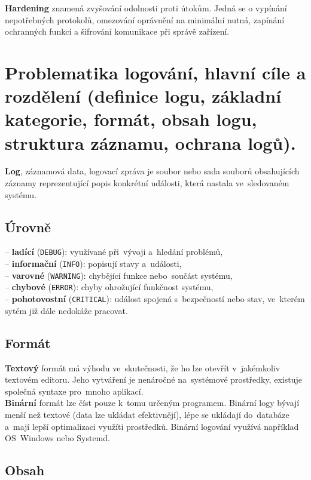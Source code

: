 \textbf{Hardening} znamená zvyšování odolnosti proti útokům. Jedná se o vypínání nepotřebných protokolů, omezování oprávnění na minimální nutná, zapínání ochranných funkcí a šifrování komunikace při správě zařízení.

\clearpage
\section{Problematika logování, hlavní cíle a rozdělení (definice logu, základní kategorie, formát, obsah logu, struktura záznamu, ochrana logů).}

\textbf{Log}, záznamová data, logovací zpráva je soubor nebo sada souborů obsahujících záznamy reprezentující popis konkrétní události, která nastala ve~sledovaném systému.

\subsection{Úrovně}

-- \textbf{ladící} (\texttt{DEBUG}): využívané při~vývoji a~hledání problémů, \\
-- \textbf{informační} (\texttt{INFO}): popisují stavy a~události, \\
-- \textbf{varovné} (\texttt{WARNING}): chybějící funkce nebo~součást systému, \\
-- \textbf{chybové} (\texttt{ERROR}): chyby ohrožující funkčnost systému, \\
-- \textbf{pohotovostní} (\texttt{CRITICAL}): událost spojená s~bezpečností nebo stav, ve~kterém sytém již dále nedokáže pracovat.

\subsection{Formát}

\textbf{Textový} formát má výhodu ve~skutečnosti, že ho lze otevřít v~jakémkoliv textovém editoru. Jeho vytváření je nenáročné na~systémové prostředky, existuje společná syntaxe pro~mnoho aplikací. \\
\textbf{Binární} formát lze číst pouze k~tomu určeným programem. Binární logy bývají menší než textové (data lze ukládat efektivnějí), lépe se ukládají do~databáze a~mají lepší optimalizaci využíti prostředků. Binární logování využívá například OS~Windows nebo Systemd.

\subsection{Obsah}

